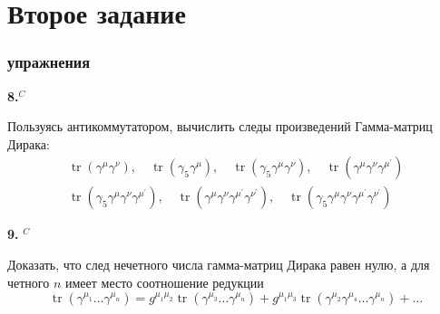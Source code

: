 \documentclass[a4paper,12pt]{article} %
\begin{document}
\clearpage
\part{Второе задание}


\section{упражнения}

\begin{task}\textbf{8.}$^{C}$ 
	
	Пользуясь антикоммутатором, вычислить следы произведений Гамма-матриц Дирака:
$$
\begin{array}{l}
\operatorname{tr}\left(\gamma^{\mu} \gamma^{\nu}\right), 
\quad 
\operatorname{tr}\left(\gamma_{5} \gamma^{\mu}\right), 
\quad 
\operatorname{tr}\left(\gamma_{5} \gamma^{\mu} \gamma^{\nu}\right), 
\quad 
\operatorname{tr}\left(\gamma^{\mu} \gamma^{\nu} \gamma^{\mu^{\prime}}\right) 
\\
\operatorname{tr}\left(\gamma_{5} \gamma^{\mu} \gamma^{\nu} \gamma^{\mu^{\prime}}\right), 
\quad 
\operatorname{tr}\left(\gamma^{\mu} \gamma^{\nu} \gamma^{\mu^{\prime}} \gamma^{\nu^{\prime}}\right), 
\quad 
\operatorname{tr}\left(\gamma_{5} \gamma^{\mu} \gamma^{\nu} \gamma^{\mu^{\prime}} \gamma^{\nu^{\prime}}\right)
\end{array}
$$












\end{task}



\begin{task}\textbf{9.} $^{C}$ 

Доказать, что след нечетного числа гамма-матриц Дирака равен нулю, а для четного $n$ имеет место соотношение редукции
$$
\operatorname{tr}\left(\gamma^{\mu_{1}} \ldots \gamma^{\mu_{n}}\right)=
g^{\mu_{1} \mu_{2}} \operatorname{tr}\left(\gamma^{\mu_{3}} \ldots \gamma^{\mu_{n}}\right)+
g^{\mu_{1} \mu_{3}} \operatorname{tr}\left(\gamma^{\mu_{2}} \gamma^{\mu_{4}} \ldots \gamma^{\mu_{n}}\right)+
\ldots
$$
























\end{task}
\end{document}
